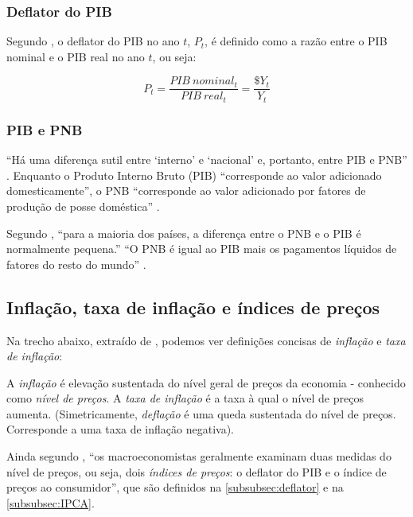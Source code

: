 \documentclass[
	10pt,				%
	openright,			%
	twoside,			%
	a5paper,			%
	english,			%
	french,				%
	spanish,			%
	brazil				%
	]{abntex2}
\renewenvironment{quote}
  {\small\list{}{\rightmargin=0.1cm \leftmargin=4cm}%
   \item\relax}
  {\endlist}
\begin{document}
\subsubsection{Deflator do PIB}\label{subsubsec:deflator}

Segundo \cite[p.~29]{blanchard}, o deflator do PIB no ano \(t\),
\(P_t\), é definido como a razão entre o PIB nominal e o PIB real no ano
\(t\), ou seja:

\[P_t = \frac{PIB\: nominal_t}{PIB\: real_t} = \frac{\$Y_t}{Y_t}\]

\subsubsection{PIB e PNB}\label{pib-e-pnb}

``Há uma diferença sutil entre `interno' e `nacional' e, portanto, entre
PIB e PNB'' \cite[p.~20]{blanchard}. Enquanto o Produto Interno Bruto
(PIB) ``corresponde ao valor adicionado domesticamente'', o PNB
``corresponde ao valor adicionado por fatores de produção de posse
doméstica'' \cite[p.~363]{blanchard}.

Segundo \cite{blanchard}, ``para a maioria dos países, a diferença entre
o PNB e o PIB é normalmente pequena.'' ``O PNB é igual ao PIB mais os
pagamentos líquidos de fatores do resto do mundo''
\cite[p.~363]{blanchard}.

\subsection{Inflação, taxa de inflação e índices de
preços}\label{inflauxe7uxe3o-taxa-de-inflauxe7uxe3o-e-uxedndices-de-preuxe7os}

Na trecho abaixo, extraído de , podemos ver
definições concisas de \emph{inflação} e \emph{taxa de inflação}:

\begin{quote}
A \emph{inflação} é elevação sustentada do nível geral de preços da
economia - conhecido como \emph{nível de preços}. A \emph{taxa de
inflação} é a taxa à qual o nível de preços aumenta. (Simetricamente,
\emph{deflação} é uma queda sustentada do nível de preços. Corresponde a
uma taxa de inflação negativa).
\end{quote}

Ainda segundo , ``os macroeconomistas
geralmente examinam duas medidas do nível de preços, ou seja, dois
\emph{índices de preços}: o deflator do PIB e o índice de preços ao
consumidor'', que são definidos na \autoref{subsubsec:deflator} e na
\autoref{subsubsec:IPCA}.
\end{document}
